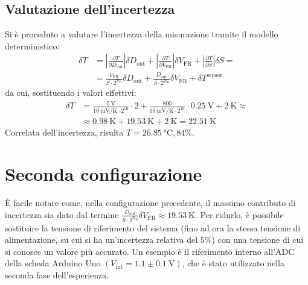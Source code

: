 \documentclass{article}
\begin{document}
\subsection{Valutazione dell'incertezza}
Si è proceduto a valutare l'incertezza della misurazione tramite il modello deterministico:
\begin{equation*}
    \begin{split}
        \delta T&=\left|\frac{\partial T}{\partial D_{\text{out}}}\right|\delta D_{\text{out}}+\left|\frac{\partial T}{\partial V_{\text{FR}}}\right|\delta V_{\text{FR}}+\left|\frac{\partial T}{\partial S}\right|\delta S=\\
        &=\frac{V_{\text{FR}}}{S\cdot2^{\text{N}_\text{B}}}\delta D_{\text{out}}+\frac{D_{\text{out}}}{S\cdot2^{\text{N}_\text{B}}}\delta V_{\text{FR}}+\delta T^{\text{sensor}}
    \end{split}
\end{equation*}
da cui, sostituendo i valori effettivi:
\begin{equation*}
    \begin{split}    
        \delta T&=\frac{\SI{5}\volt}{\SI{10}{\milli\volt\per\kelvin}\cdot2^{10}}\cdot 2+\frac{800}{\SI{10}{\milli\volt\per\kelvin}\cdot 2^{10}}\cdot\SI{0.25}{\volt}+\SI{2}{\kelvin}\approx\\&\approx \SI{0.98}{\kelvin}+\SI{19.53}{\kelvin}+\SI{2}{\kelvin}=\SI{22.51}{\kelvin}
    \end{split}    
\end{equation*}
Correlata dell'incertezza, risulta $T = \SI{26.85}{\celsius}, 84\%$.
\section{Seconda configurazione}
È facile notare come, nella configurazione precedente, il massimo contributo di incertezza sia dato dal termine $\frac{D_{\text{out}}}{S\cdot2^{\text{N}_\text{B}}}\delta V_{\text{FR}}\approx\SI{19.53}{\kelvin}$. Per ridurlo, è
possibile sostituire la tensione di riferimento del sistema (fino ad ora la stessa tensione di alimentazione, su cui si ha un'incertezza relativa del $5\%$) con una tensione di cui si conosce un valore più accurato. Un esempio
è il riferimento interno all'ADC della scheda Arduino Uno $(V_{\text{int}}=1.1\pm\SI{0.1}{\volt})$, che è stato utilizzato nella seconda fase dell'esperienza.
\end{document}

